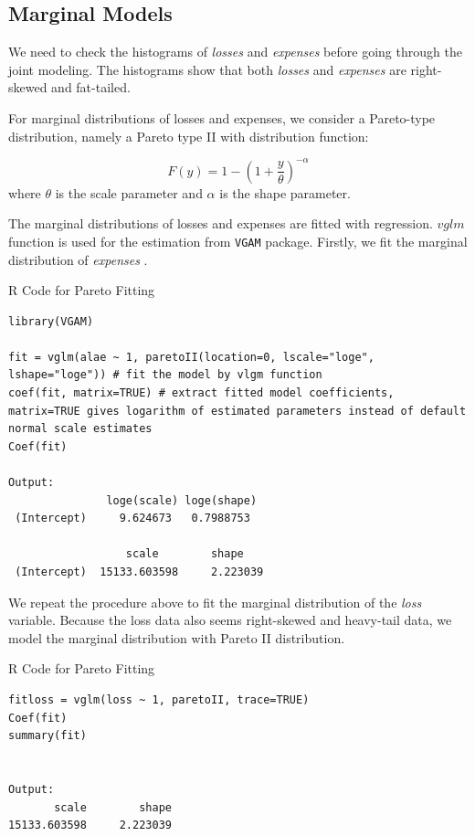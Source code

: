 \documentclass[]{book}
\theoremstyle{definition}
\theoremstyle{definition}
\theoremstyle{definition}
\theoremstyle{remark}
\begin{document}
\subsection{Marginal Models}\label{marginal-models}

We need to check the histograms of \emph{losses } and \emph{expenses }
before going through the joint modeling. The histograms show that both
\emph{losses } and \emph{expenses } are right-skewed and fat-tailed.

For marginal distributions of losses and expenses, we consider a
Pareto-type distribution, namely a Pareto type II with distribution
function:

\[ F(y)=1- \left( 1 + \frac{y}{\theta} \right) ^{-\alpha}\] where
\(\theta\) is the scale parameter and \(\alpha\) is the shape parameter.

The marginal distributions of losses and expenses are fitted with
regression. \(vglm\) function is used for the estimation from
\texttt{VGAM} package. Firstly, we fit the marginal distribution of
\emph{expenses }.

R Code for Pareto Fitting

\hypertarget{display.Reg.2}{}
\begin{verbatim}
library(VGAM)

fit = vglm(alae ~ 1, paretoII(location=0, lscale="loge", lshape="loge")) # fit the model by vlgm function
coef(fit, matrix=TRUE) # extract fitted model coefficients, matrix=TRUE gives logarithm of estimated parameters instead of default normal scale estimates
Coef(fit)

Output: 
               loge(scale) loge(shape)
 (Intercept)     9.624673   0.7988753
 
                  scale        shape 
 (Intercept)  15133.603598     2.223039 
\end{verbatim}

We repeat the procedure above to fit the marginal distribution of the
\emph{loss} variable. Because the loss data also seems right-skewed and
heavy-tail data, we model the marginal distribution with Pareto II
distribution.

R Code for Pareto Fitting

\hypertarget{display.ParFit.2}{}
\begin{verbatim}
fitloss = vglm(loss ~ 1, paretoII, trace=TRUE)
Coef(fit)
summary(fit)


Output: 
       scale        shape 
15133.603598     2.223039 
\end{verbatim}
\end{document}
